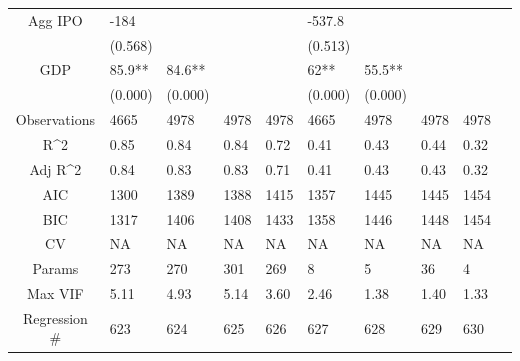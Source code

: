 \documentclass{article}
\begin{document}
\begin{table}[H]
\begin{tabular}{|clllllllll|}
  Agg IPO & -184 &  &  &  & -537.8 &  &  &  & \\ 
   & (0.568) &  &  &  & (0.513) &  &  &  & \\ 
  GDP & 85.9** & 84.6** &  &  & 62** & 55.5** &  &  & \\ 
   & (0.000) & (0.000) &  &  & (0.000) & (0.000) &  &  & \\ 
  \hline 
 Observations & 4665 & 4978 & 4978 & 4978 & 4665 & 4978 & 4978 & 4978 & \\ 
  R^2 & 0.85 & 0.84 & 0.84 & 0.72 & 0.41 & 0.43 & 0.44 & 0.32 & \\ 
  Adj R^2 & 0.84 & 0.83 & 0.83 & 0.71 & 0.41 & 0.43 & 0.43 & 0.32 & \\ 
  AIC & 1300 & 1389 & 1388 & 1415 & 1357 & 1445 & 1445 & 1454 & \\ 
  BIC & 1317 & 1406 & 1408 & 1433 & 1358 & 1446 & 1448 & 1454 & \\ 
  CV & NA & NA & NA & NA & NA & NA & NA & NA & \\ 
  Params & 273 & 270 & 301 & 269 & 8 & 5 & 36 & 4 & \\ 
  Max VIF & 5.11 & 4.93 & 5.14 & 3.60 & 2.46 & 1.38 & 1.40 & 1.33 & \\ 
  Regression \# & 623 & 624 & 625 & 626 & 627 & 628 & 629 & 630 & \\ 
   \hline
\end{tabular}
 
\end{table}
\end{document}
